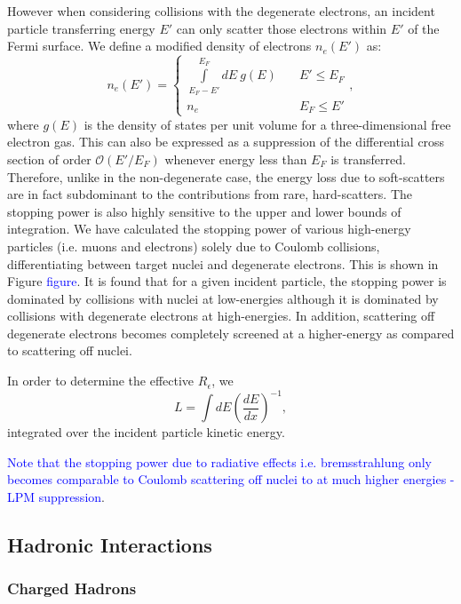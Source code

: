 \documentclass[twocolumn,showpacs,preprintnumbers,amsmath,amssymb,prl]{revtex4}
\begin{document}
However when considering collisions with the degenerate electrons, an incident particle transferring energy $E'$ can only scatter those electrons within $E'$ of the Fermi surface. We define a modified density of electrons $n_e(E')$ as:
\begin{equation}
n_e(E') = \left\{
        \begin{array}{ll}
            \displaystyle \int \limits_{E_F -E'}^{E_F}dE ~g(E) & \quad E' \leq E_F \\
            n_e & \quad E_F \leq E'
        \end{array}
    \right.,
\end{equation}
where $g(E)$ is the density of states per unit volume for a three-dimensional free electron gas. This can also be expressed as a suppression of the differential cross section of order $\mathcal{O}(E'/E_F)$ whenever energy less than $E_F$ is transferred. Therefore, unlike in the non-degenerate case, the energy loss due to soft-scatters are in fact subdominant to the contributions from rare, hard-scatters. The stopping power is also highly sensitive to the upper and lower bounds of integration. We have calculated the stopping power of various high-energy particles (i.e. muons and electrons) solely due to Coulomb collisions, differentiating between target nuclei and degenerate electrons. This is shown in Figure \textcolor{blue}{figure}. It is found that for a given incident particle, the stopping power is dominated by collisions with nuclei at low-energies although it is dominated by collisions with degenerate electrons at high-energies. In addition, scattering off degenerate electrons becomes completely screened at a higher-energy as compared to scattering off nuclei.   


In order to determine the effective $R_\epsilon$, we 
\begin{equation}
\label{eq:range}
L = \int dE \left(\frac{dE}{dx}\right)^{-1},
\end{equation}
integrated over the incident particle kinetic energy. 

\textcolor{blue}{Note that the stopping power due to radiative effects i.e. bremsstrahlung only becomes comparable to Coulomb scattering off nuclei to at much higher energies - LPM suppression}. 

\subsection{Hadronic Interactions}
\subsubsection{Charged Hadrons}
\end{document}
